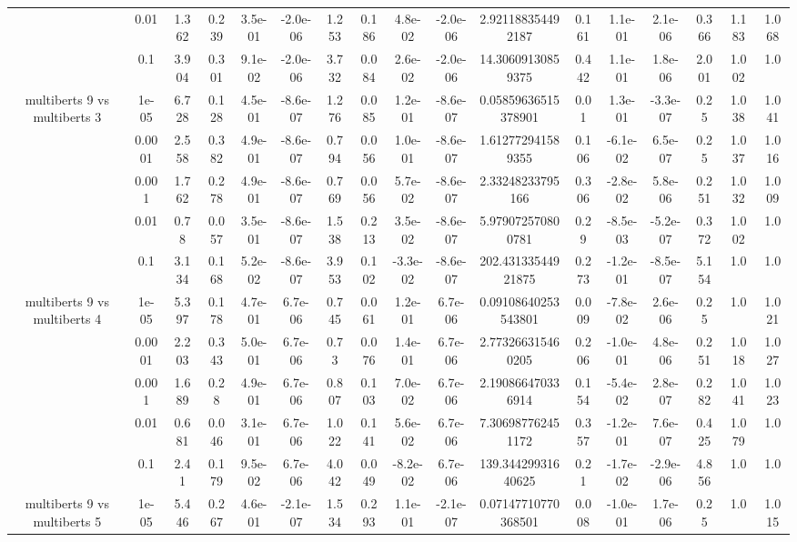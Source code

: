 \begin{tabular}{|c|c|c|c|c|c|c|c|c|c|c|c|c|c|c|c|c|}
 & 0.01 & 1.362 & 0.239 & 3.5e-01 & -2.0e-06 & 1.253 & 0.186 & 4.8e-02 & -2.0e-06 & 2.921188354492187 & 0.161 & 1.1e-01 & 2.1e-06 & 0.366 & 1.183 & 1.068 \\
 & 0.1 & 3.904 & 0.301 & 9.1e-02 & -2.0e-06 & 3.732 & 0.084 & 2.6e-02 & -2.0e-06 & 14.30609130859375 & 0.442 & 1.1e-01 & 1.8e-06 & 2.001 & 1.002 & 1.0 \\
\hline
\multirow{5}{*}{multiberts 9 vs multiberts 3} & 1e-05 & 6.728 & 0.128 & 4.5e-01 & -8.6e-07 & 1.276 & 0.085 & 1.2e-01 & -8.6e-07 & 0.05859636515378901 & 0.01 & 1.3e-01 & -3.3e-07 & 0.25 & 1.038 & 1.041 \\
 & 0.0001 & 2.558 & 0.382 & 4.9e-01 & -8.6e-07 & 0.794 & 0.056 & 1.0e-01 & -8.6e-07 & 1.612772941589355 & 0.106 & -6.1e-02 & 6.5e-07 & 0.25 & 1.037 & 1.016 \\
 & 0.001 & 1.762 & 0.278 & 4.9e-01 & -8.6e-07 & 0.769 & 0.056 & 5.7e-02 & -8.6e-07 & 2.33248233795166 & 0.306 & -2.8e-02 & 5.8e-06 & 0.251 & 1.032 & 1.009 \\
 & 0.01 & 0.78 & 0.057 & 3.5e-01 & -8.6e-07 & 1.538 & 0.213 & 3.5e-02 & -8.6e-07 & 5.979072570800781 & 0.29 & -8.5e-03 & -5.2e-07 & 0.372 & 1.002 & 1.0 \\
 & 0.1 & 3.134 & 0.168 & 5.2e-02 & -8.6e-07 & 3.953 & 0.102 & -3.3e-02 & -8.6e-07 & 202.43133544921875 & 0.273 & -1.2e-01 & -8.5e-07 & 5.154 & 1.0 & 1.0 \\
\hline
\multirow{5}{*}{multiberts 9 vs multiberts 4} & 1e-05 & 5.397 & 0.178 & 4.7e-01 & 6.7e-06 & 0.745 & 0.061 & 1.2e-01 & 6.7e-06 & 0.09108640253543801 & 0.009 & -7.8e-02 & 2.6e-06 & 0.25 & 1.0 & 1.021 \\
 & 0.0001 & 2.203 & 0.343 & 5.0e-01 & 6.7e-06 & 0.73 & 0.076 & 1.4e-01 & 6.7e-06 & 2.773266315460205 & 0.206 & -1.0e-01 & 4.8e-06 & 0.251 & 1.018 & 1.027 \\
 & 0.001 & 1.689 & 0.28 & 4.9e-01 & 6.7e-06 & 0.807 & 0.103 & 7.0e-02 & 6.7e-06 & 2.190866470336914 & 0.154 & -5.4e-02 & 2.8e-07 & 0.282 & 1.041 & 1.023 \\
 & 0.01 & 0.681 & 0.046 & 3.1e-01 & 6.7e-06 & 1.022 & 0.141 & 5.6e-02 & 6.7e-06 & 7.306987762451172 & 0.357 & -1.2e-01 & 7.6e-07 & 0.425 & 1.079 & 1.0 \\
 & 0.1 & 2.41 & 0.179 & 9.5e-02 & 6.7e-06 & 4.042 & 0.049 & -8.2e-02 & 6.7e-06 & 139.34429931640625 & 0.21 & -1.7e-02 & -2.9e-06 & 4.856 & 1.0 & 1.0 \\
\hline
\multirow{5}{*}{multiberts 9 vs multiberts 5} & 1e-05 & 5.446 & 0.267 & 4.6e-01 & -2.1e-07 & 1.534 & 0.293 & 1.1e-01 & -2.1e-07 & 0.07147710770368501 & 0.008 & -1.0e-01 & 1.7e-06 & 0.25 & 1.0 & 1.015 \\

\end{tabular}
